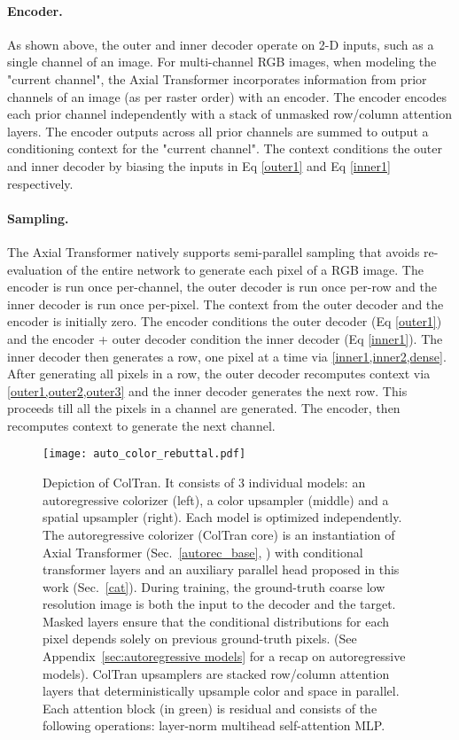 \documentclass{article} \usepackage{iclr2021_conference,times}
\begin{document}
\paragraph{Encoder.} As shown above, the outer and inner decoder operate on 2-D inputs, such as a single channel of an image. For multi-channel  RGB images, when modeling the "current channel", the Axial Transformer incorporates information from prior channels of an image (as per raster order) with an encoder. The encoder encodes each prior channel independently with a stack of unmasked row/column attention layers. The encoder outputs across all prior channels are summed to output a conditioning context  for the "current channel". The context  conditions the outer and inner decoder by biasing the inputs in Eq \ref{outer1} and Eq \ref{inner1} respectively.

\paragraph{Sampling.} The Axial Transformer natively supports semi-parallel sampling that avoids re-evaluation of the entire network to generate each pixel of a RGB image. The encoder is run once per-channel, the outer decoder is run once per-row and the inner decoder is run once per-pixel. The context from the outer decoder and the encoder is initially zero. The encoder conditions the outer decoder (Eq \ref{outer1}) and the encoder + outer decoder condition the inner decoder (Eq \ref{inner1}). The inner decoder then generates a row, one pixel at a time via \cref{inner1,inner2,dense}. After generating all pixels in a row, the outer decoder recomputes context via \cref{outer1,outer2,outer3} and the inner decoder generates the next row. This proceeds till all the pixels in a channel are generated.
The encoder, then recomputes context to generate the next channel.


\begin{figure}[t]
  \centering
  \texttt{[image: auto\_color\_rebuttal.pdf]}
  \caption{Depiction of ColTran. It consists of 3 individual models: an autoregressive colorizer (left), a color upsampler (middle) and a spatial upsampler (right). Each model is optimized independently. The autoregressive colorizer (ColTran core) is an instantiation of Axial Transformer (Sec.~\ref{autorec_base}, \citet{ho2019axial}) with conditional transformer layers and an auxiliary parallel head proposed in this work (Sec.~\ref{cat}). During training, the ground-truth coarse low resolution image is both the input to the decoder and the target. Masked layers ensure that the conditional distributions for each pixel depends solely on previous ground-truth pixels. (See Appendix~\ref{sec:autoregressive models} for a recap on autoregressive models). ColTran upsamplers are stacked row/column attention layers that deterministically upsample color and space in parallel. Each attention block (in green) is residual and consists of the following operations: layer-norm  multihead self-attention  MLP.}\label{fig:illustration}
\end{figure}
\end{document}
